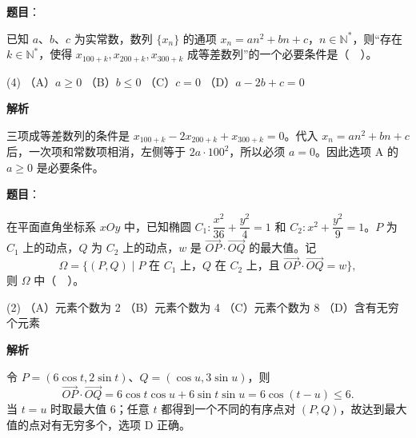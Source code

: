 \begin{answer}

\textbf{题目}：

已知 $a\text{、}b\text{、}c$ 为实常数，数列 $\{x_n\}$ 的通项 $x_n=an^2+bn+c$，$n\in\mathbb N^*$，则“存在 $k\in\mathbb N^*$，使得 $x_{100+k},x_{200+k},x_{300+k}$ 成等差数列”的一个必要条件是（　）。

\begin{gkopts}(4)
\task （A）$a\geqslant0$
\task （B）$b\leqslant0$
\task （C）$c=0$
\task （D）$a-2b+c=0$
\end{gkopts}

\textbf{解析}

三项成等差数列的条件是 $x_{100+k}-2x_{200+k}+x_{300+k}=0$。代入 $x_n=an^2+bn+c$ 后，一次项和常数项相消，左侧等于 $2a\cdot100^2$，所以必须 $a=0$。因此选项 A 的 $a\geqslant0$ 是必要条件。


\end{answer}
\begin{answer}

\textbf{题目}：

在平面直角坐标系 $xOy$ 中，已知椭圆 $C_1:\dfrac{x^2}{36}+\dfrac{y^2}{4}=1$ 和 $C_2:x^2+\dfrac{y^2}{9}=1$。$P$ 为 $C_1$ 上的动点，$Q$ 为 $C_2$ 上的动点，$w$ 是 $\overrightarrow{OP}\cdot\overrightarrow{OQ}$ 的最大值。记
\nopagebreak[4]
\[
\Omega=\{(P,Q)\mid P\text{ 在 }C_1\text{ 上，}Q\text{ 在 }C_2\text{ 上，且 }\overrightarrow{OP}\cdot\overrightarrow{OQ}=w\},
\]
则 $\Omega$ 中（　）。

\begin{gkopts}(2)
\task （A）元素个数为 2
\task （B）元素个数为 4
\task （C）元素个数为 8
\task （D）含有无穷个元素
\end{gkopts}

\textbf{解析}

令 $P=(6\cos t,2\sin t)$、$Q=(\cos u,3\sin u)$，则
\nopagebreak[4]
\[
\overrightarrow{OP}\cdot\overrightarrow{OQ}=6\cos t\cos u+6\sin t\sin u=6\cos(t-u)\leqslant6.
\]
当 $t=u$ 时取最大值 $6$；任意 $t$ 都得到一个不同的有序点对 $(P,Q)$，故达到最大值的点对有无穷多个，选项 D 正确。


\end{answer}
